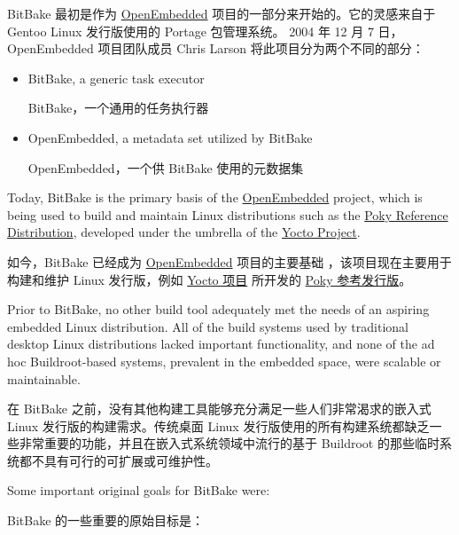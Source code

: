 BitBake 最初是作为 \href{https://www.openembedded.org/}{OpenEmbedded} 项目的一部分来开始的。它的灵感来自于 Gentoo Linux 发行版使用的 Portage 包管理系统。 2004 年 12 月 7 日，OpenEmbedded 项目团队成员 Chris Larson 将此项目分为两个不同的部分：

\begin{itemize}
\setlength\itemsep{1.0em}

\item BitBake, a generic task executor

\medskip
BitBake，一个通用的任务执行器

\item OpenEmbedded, a metadata set utilized by BitBake

\medskip
OpenEmbedded，一个供 BitBake 使用的元数据集

\end{itemize}

Today, BitBake is the primary basis of the \href{https://www.openembedded.org/}{OpenEmbedded} project, which is being used to build and maintain Linux distributions such as the \href{https://www.yoctoproject.org/software-item/poky/}{Poky Reference Distribution}, developed under the umbrella of the \href{https://www.yoctoproject.org/}{Yocto Project}.

如今，BitBake 已经成为 \href{https://www.openembedded.org/}{OpenEmbedded} 项目的主要基础 ，该项目现在主要用于构建和维护 Linux 发行版，例如 \href{https://www.yoctoproject.org/}{Yocto 项目} 所开发的 \href{https://www.yoctoproject.org/software-item/poky/}{Poky 参考发行版}。

Prior to BitBake, no other build tool adequately met the needs of an aspiring embedded Linux distribution. All of the build systems used by traditional desktop Linux distributions lacked important functionality, and none of the ad hoc Buildroot-based systems, prevalent in the embedded space, were scalable or maintainable.

在 BitBake 之前，没有其他构建工具能够充分满足一些人们非常渴求的嵌入式 Linux 发行版的构建需求。传统桌面 Linux 发行版使用的所有构建系统都缺乏一些非常重要的功能，并且在嵌入式系统领域中流行的基于 Buildroot 的那些临时系统都不具有可行的可扩展或可维护性。

Some important original goals for BitBake were:

BitBake 的一些重要的原始目标是：

